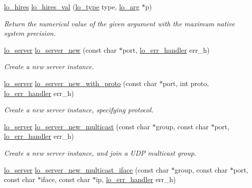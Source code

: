 \begin{DoxyCompactItemize}
\hyperlink{group__liblolowlevel_ga0062385786b0375d4b6954ba1fb8d52b}{lo\+\_\+hires} \hyperlink{group__liblolowlevel_gafb7036664581480c9f2e898e57704c1b}{lo\+\_\+hires\+\_\+val} (\hyperlink{group__liblo_ga11838c576b0197c255ce805fd7434736}{lo\+\_\+type} type, \hyperlink{unionlo__arg}{lo\+\_\+arg} $\ast$p)
\begin{DoxyCompactList}\small\item\em Return the numerical value of the given argument with the maximum native system precision. \end{DoxyCompactList}\item 
\hyperlink{lo__types_8h_a59067bf50cf8abb4371da6f03c9036c9}{lo\+\_\+server} \hyperlink{group__liblolowlevel_ga78cfb23346e44465695293d4393447ae}{lo\+\_\+server\+\_\+new} (const char $\ast$port, \hyperlink{lo__types_8h_aa5d2e4aa0ff9d4459fcc76e7ed5839fc}{lo\+\_\+err\+\_\+handler} err\+\_\+h)
\begin{DoxyCompactList}\small\item\em Create a new server instance. \end{DoxyCompactList}\item 
\hyperlink{lo__types_8h_a59067bf50cf8abb4371da6f03c9036c9}{lo\+\_\+server} \hyperlink{group__liblolowlevel_ga4afa474b11ed0d4511857ae79c56aaa1}{lo\+\_\+server\+\_\+new\+\_\+with\+\_\+proto} (const char $\ast$port, int proto, \hyperlink{lo__types_8h_aa5d2e4aa0ff9d4459fcc76e7ed5839fc}{lo\+\_\+err\+\_\+handler} err\+\_\+h)
\begin{DoxyCompactList}\small\item\em Create a new server instance, specifying protocol. \end{DoxyCompactList}\item 
\hyperlink{lo__types_8h_a59067bf50cf8abb4371da6f03c9036c9}{lo\+\_\+server} \hyperlink{group__liblolowlevel_ga849f4517a29ad850069cf8f2976a9284}{lo\+\_\+server\+\_\+new\+\_\+multicast} (const char $\ast$group, const char $\ast$port, \hyperlink{lo__types_8h_aa5d2e4aa0ff9d4459fcc76e7ed5839fc}{lo\+\_\+err\+\_\+handler} err\+\_\+h)
\begin{DoxyCompactList}\small\item\em Create a new server instance, and join a U\+D\+P multicast group. \end{DoxyCompactList}\item 
\hyperlink{lo__types_8h_a59067bf50cf8abb4371da6f03c9036c9}{lo\+\_\+server} \hyperlink{group__liblolowlevel_gadec49f210324f499f2e9593df20128cb}{lo\+\_\+server\+\_\+new\+\_\+multicast\+\_\+iface} (const char $\ast$group, const char $\ast$port, const char $\ast$iface, const char $\ast$ip, \hyperlink{lo__types_8h_aa5d2e4aa0ff9d4459fcc76e7ed5839fc}{lo\+\_\+err\+\_\+handler} err\+\_\+h)

\end{DoxyCompactItemize}
